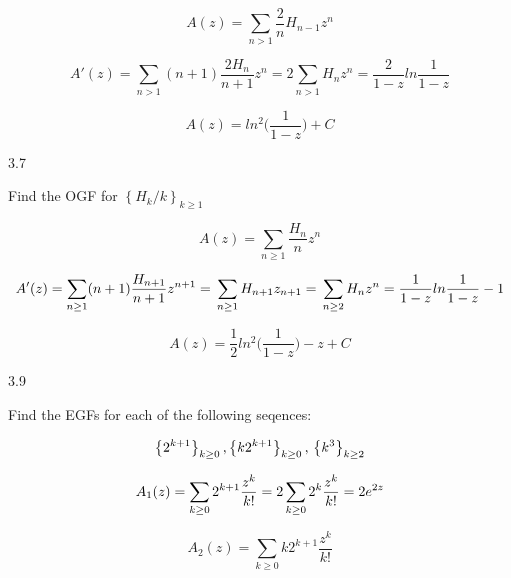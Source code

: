 \documentclass[12pt]{article}
\begin{document}
\begin{equation}
A(z) = \sum_{n > 1}\frac{2}{n}H_{n - 1}z^n \nonumber
\end{equation}

\begin{equation}
    A'(z) = \sum_{n > 1}(n + 1) \frac{2H_n}{n + 1} z^n = 2\sum_{n > 1} H_nz^n = \frac{2}{1 - z}ln\frac{1}{1 - z} \nonumber
\end{equation}

\begin{equation}
    A(z) = ln^2\bigg(\frac{1}{1 - z}\bigg) + C \nonumber
\end{equation}

3.7

Find the OGF for ${ \left\{H_k/k \right\}_{k \geq 1} }$

\begin{equation}
A(z) = \sum_{n \geq 1}\frac{H_n}{n}z^n\nonumber
\end{equation}


\begin{equation}
A'(z) = \sum_{n \geq 1}(n + 1)\frac{H_{n+1}}{n + 1}z^{n + 1} = \\
\sum_{n \geq 1} H_{n + 1}z_{n+1} = \\
\sum_{n \geq 2} H_{n}z^{n} = \frac{1}{1-z}ln\frac{1}{1-z} - 1 \nonumber
\end{equation}

\begin{equation}
A(z) = \frac{1}{2}ln^2\bigg(\frac{1}{1-z} \bigg) - z + C \nonumber
\end{equation}

3.9

Find the EGFs for each of the following seqences:

\begin{equation}
\left\{ 2^{k+1}\right\}_{k \geq 0}, \left\{k2^{k+1}\right\}_{k \geq 0}, \\
\left\{k^3\right\}_{k \geq 2} \nonumber
\end{equation}

\begin{equation}
A_1(z) = \sum_{k \geq 0}2^{k+1}\frac{z^k}{k!} = \\
2\sum_{k \geq 0}2^k\frac{z^k}{k!} = 2e^{2z}\nonumber
\end{equation}

\begin{equation}
A_2(z) = \sum_{k \geq 0}k2^{k+1}\frac{z^k}{k!} \nonumber
\end{equation}
\end{document}
